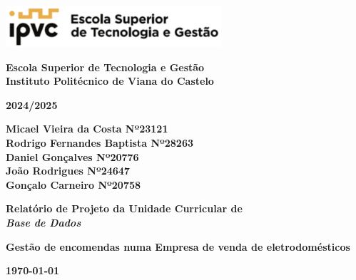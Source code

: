 \documentclass{article}
\begin{document}

\begin{titlepage}
    \begin{center}
        \includegraphics[width=0.6\textwidth]{imagens/estg.png} \vspace{1.5cm}
        
        \textbf{\Large Escola Superior de Tecnologia e Gestão \\ Instituto Politécnico de Viana do Castelo} \vspace{2cm}
        
        \textbf{\Large 2024/2025} \vspace{1.5cm}
        
       \textbf{Micael Vieira da Costa  Nº23121 \\ Rodrigo Fernandes Baptista  Nº28263 \\ Daniel Gonçalves  Nº20776 \\ João Rodrigues Nº24647 \\ Gonçalo Carneiro Nº20758} \vspace{1.2cm}
                                                                                          
        \textbf{\Large Relatório de Projeto da Unidade Curricular de \\ \textit{Base de Dados}} \vspace{1.5cm}
        
        \textbf{\Large Gestão de encomendas numa Empresa de venda de eletrodomésticos} \vspace{4cm}
        
        \textbf{\today}
    \end{center}
\end{titlepage}

\renewcommand*\contentsname{Índice}
\tableofcontents
\newpage
\newpage

\end{document}
